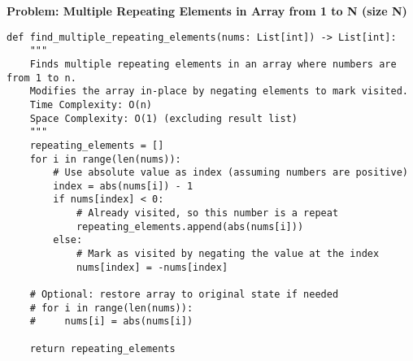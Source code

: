 \noindent\textbf{Problem: Multiple Repeating Elements in Array from 1 to N (size N)}
\begin{verbatim}
def find_multiple_repeating_elements(nums: List[int]) -> List[int]:
    """
    Finds multiple repeating elements in an array where numbers are from 1 to n.
    Modifies the array in-place by negating elements to mark visited.
    Time Complexity: O(n)
    Space Complexity: O(1) (excluding result list)
    """
    repeating_elements = []
    for i in range(len(nums)):
        # Use absolute value as index (assuming numbers are positive)
        index = abs(nums[i]) - 1
        if nums[index] < 0:
            # Already visited, so this number is a repeat
            repeating_elements.append(abs(nums[i]))
        else:
            # Mark as visited by negating the value at the index
            nums[index] = -nums[index]
    
    # Optional: restore array to original state if needed
    # for i in range(len(nums)):
    #     nums[i] = abs(nums[i])

    return repeating_elements
\end{verbatim}

